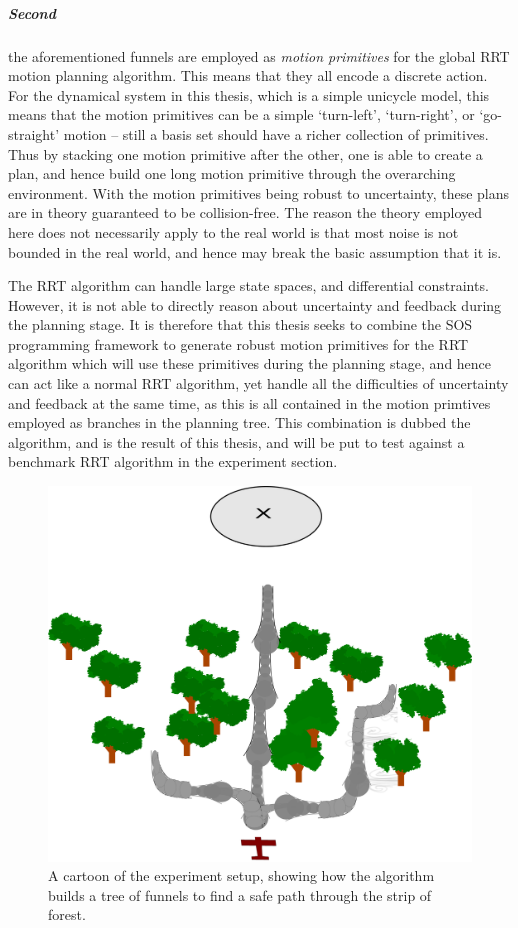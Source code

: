 \subparagraph{Second} the aforementioned funnels are employed as \textit{motion
  primitives} for the global \ac{RRT} motion planning algorithm. This means that
they all encode a discrete action. For the dynamical system in this thesis,
which is a simple unicycle model, this means that the motion primitives can be a
simple `turn-left', `turn-right', or `go-straight' motion -- still a basis set
should have a richer collection of primitives. Thus by stacking one motion
primitive after the other, one is able to create a plan, and hence build one
long motion primitive through the overarching environment. With the motion
primitives being robust to uncertainty, these plans are in theory guaranteed to
be collision-free. The reason the theory employed here does not necessarily
apply to the real world is that most noise is not bounded in the real world, and
hence may break the basic assumption that it is.

The \ac{RRT} algorithm can handle large state spaces, and differential
constraints. However, it is not able to directly reason about uncertainty and
feedback during the planning stage. It is therefore that this thesis seeks to
combine the \ac{SOS} programming framework to generate robust motion primitives
for the \ac{RRT} algorithm which will use these primitives during the planning
stage, and hence can act like a normal \ac{RRT} algorithm, yet handle all the
difficulties of uncertainty and feedback at the same time, as this is all
contained in the motion primtives employed as branches in the planning tree.
This combination is dubbed the \rrtfunnel{} algorithm, and is the result of this
thesis, and will be put to test against a benchmark \ac{RRT} algorithm in the
experiment section.

\begin{figure}
  \centering
  \includegraphics[scale=.1]{figures/experiments/experiment-airplane-strip}
  \caption{A cartoon of the experiment setup, showing how the \rrtfunnel{}
    algorithm builds a tree of funnels to find a safe path through the strip of
    forest.}
  \label{fig:experiments-cartoon}
\end{figure}

